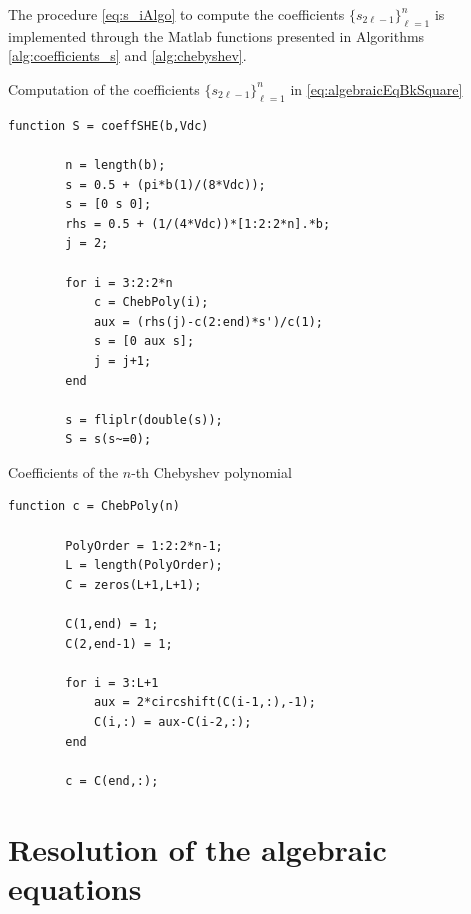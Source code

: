 \documentclass[a4paper]{article}
\numberwithin{equation}{section}
\begin{document}
{The procedure \eqref{eq:s_iAlgo} to compute the coefficients $\{s_{2\ell-1}\}_{\ell=1}^n$ is implemented through the Matlab functions presented in Algorithms \ref{alg:coefficients_s} and \ref{alg:chebyshev}.

\begin{algorithm}
	\caption{Computation of the coefficients $\{s_{2\ell-1}\}_{\ell=1}^n$ in \eqref{eq:algebraicEqBkSquare}} \label{alg:coefficients_s}
	\begin{lstlisting}[style=Matlab-editor, basicstyle=\mlttfamily\footnotesize]
		function S = coeffSHE(b,Vdc)
		
		n = length(b);
		s = 0.5 + (pi*b(1)/(8*Vdc));
		s = [0 s 0];
		rhs = 0.5 + (1/(4*Vdc))*[1:2:2*n].*b; 
		j = 2;
		
		for i = 3:2:2*n
			c = ChebPoly(i);
			aux = (rhs(j)-c(2:end)*s')/c(1);
			s = [0 aux s];
			j = j+1;
		end
		
		s = fliplr(double(s));
		S = s(s~=0);
	\end{lstlisting}
\end{algorithm}

\begin{algorithm}
	\caption{Coefficients of the $n$-th Chebyshev polynomial} \label{alg:chebyshev}
	\begin{lstlisting}[style=Matlab-editor, basicstyle=\mlttfamily\footnotesize]
		function c = ChebPoly(n)
		
		PolyOrder = 1:2:2*n-1;
		L = length(PolyOrder);
		C = zeros(L+1,L+1);
		
		C(1,end) = 1;
		C(2,end-1) = 1;
		
		for i = 3:L+1
			aux = 2*circshift(C(i-1,:),-1);
			C(i,:) = aux-C(i-2,:);
		end
		
		c = C(end,:);
	\end{lstlisting}
\end{algorithm}

\section{Resolution of the algebraic equations}\label{sec:appendix2}

}
\end{document}
